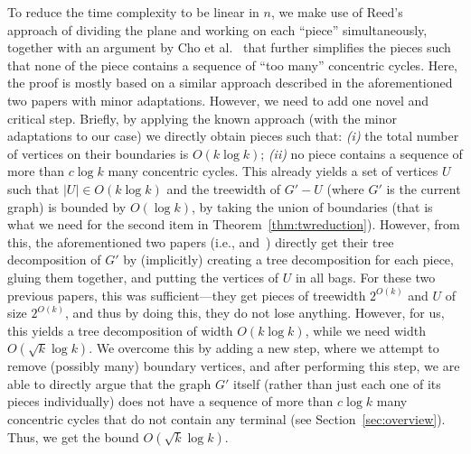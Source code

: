\documentclass{article}
\numberwithin{claimcounter}{lemma}
\begin{document}
 To reduce the time complexity to be linear in $n$, we make use of Reed's~\cite{reedLinear} approach of dividing the plane and working on each ``piece'' simultaneously, together with an argument by Cho et al.~\cite{cho2023parameterized} that further simplifies the pieces such that none of the piece contains a sequence of ``too many'' concentric cycles. Here, the proof is mostly based on  a similar approach described in the aforementioned two papers with minor adaptations. However, we need to add one novel and critical step. Briefly,  by applying the  known approach (with the minor adaptations to our case) we directly obtain pieces such that: {\em (i)} the total number of vertices on their boundaries is $O(k\log k)$; {\em (ii)} no piece contains a sequence of more than $c\log k$ many concentric cycles. This already yields a set of vertices $U$ such that  $|U|\in O(k\log k)$ and the treewidth of $G'-U$ (where $G'$ is the current graph) is bounded by $O(\log k)$, by taking the union of boundaries (that is what we need for the second item in Theorem~\ref{thm:twreduction}). However, from this, the aforementioned two papers (i.e., \cite{reedLinear} and~\cite{cho2023parameterized}) directly get their tree decomposition of $G'$ by (implicitly) creating a tree decomposition for each piece, gluing them together, and putting the vertices of $U$ in all bags. For these two previous papers, this was sufficient---they get pieces of treewidth $2^{O(k)}$ and $U$ of size $2^{O(k)}$, and thus by doing this, they do not lose anything. However, for us, this yields a tree decomposition of width $O(k\log k)$, while we need width $O(\sqrt{k}\log k)$. We overcome this by adding a new step, where we attempt to remove (possibly many) boundary vertices, and after performing this step, we are able to directly argue that the graph $G'$ itself (rather than just each one of its pieces individually) does not have a sequence of more than $c\log k$ many concentric cycles that do not contain any terminal  (see Section~\ref{sec:overview}). Thus, we get the bound $O(\sqrt{k}\log k)$.
 
\end{document}
